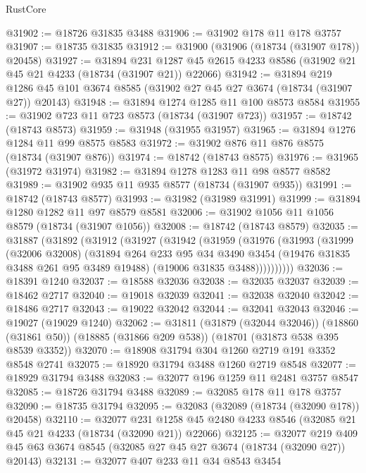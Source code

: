 \begin{lexlean}{RustCore}
\begin{coremodule}
@31902 := @18726 @31835 @3488
@31906 := @31902 @178 @11 @178 @3757
@31907 := @18735 @31835
@31912 := @31900 (@31906 (@18734 (@31907 @178)) @20458)
@31927 := @31894
    @231
    @1287
    @45
    @2615
    @4233
    @8586
    (@31902 @21 @45 @21 @4233 (@18734 (@31907 @21)) @22066)
@31942 := @31894
    @219
    @1286
    @45
    @101
    @3674
    @8585
    (@31902 @27 @45 @27 @3674 (@18734 (@31907 @27)) @20143)
@31948 := @31894 @1274 @1285 @11 @100 @8573 @8584
@31955 := @31902 @723 @11 @723 @8573 (@18734 (@31907 @723))
@31957 := @18742 (@18743 @8573)
@31959 := @31948 (@31955 @31957)
@31965 := @31894 @1276 @1284 @11 @99 @8575 @8583
@31972 := @31902 @876 @11 @876 @8575 (@18734 (@31907 @876))
@31974 := @18742 (@18743 @8575)
@31976 := @31965 (@31972 @31974)
@31982 := @31894 @1278 @1283 @11 @98 @8577 @8582
@31989 := @31902 @935 @11 @935 @8577 (@18734 (@31907 @935))
@31991 := @18742 (@18743 @8577)
@31993 := @31982 (@31989 @31991)
@31999 := @31894 @1280 @1282 @11 @97 @8579 @8581
@32006 := @31902 @1056 @11 @1056 @8579 (@18734 (@31907 @1056))
@32008 := @18742 (@18743 @8579)
@32035 := @31887
    (@31892
      (@31912
        (@31927
          (@31942
            (@31959
              (@31976
                (@31993
                  (@31999
                    (@32006 @32008)
                    (@31894
                      @264
                      @233
                      @95
                      @34
                      @3490
                      @3454
                      (@19476 @31835 @3488 @261 @95 @3489 @19488)
                      (@19006 @31835 @3488))))))))))
@32036 := @18391 @1240
@32037 := @18588 @32036
@32038 := @32035 @32037
@32039 := @18462 @2717
@32040 := @19018 @32039
@32041 := @32038 @32040
@32042 := @18486 @2717
@32043 := @19022 @32042
@32044 := @32041 @32043
@32046 := @19027 (@19029 @1240)
@32062 := @31811
    (@31879 (@32044 @32046))
    (@18860 (@31861 @50))
    (@18885 (@31866 @209 @538))
    (@18701 (@31873 @538 @395 @8539 @3352))
@32070 := @18908 @31794 @304 @1260 @2719 @191 @3352 @8548 @2741
@32075 := @18920 @31794 @3488 @1260 @2719 @8548
@32077 := @18929 @31794 @3488
@32083 := @32077 @196 @1259 @11 @2481 @3757 @8547
@32085 := @18726 @31794 @3488
@32089 := @32085 @178 @11 @178 @3757
@32090 := @18735 @31794
@32095 := @32083 (@32089 (@18734 (@32090 @178)) @20458)
@32110 := @32077
    @231
    @1258
    @45
    @2480
    @4233
    @8546
    (@32085 @21 @45 @21 @4233 (@18734 (@32090 @21)) @22066)
@32125 := @32077
    @219
    @409
    @45
    @63
    @3674
    @8545
    (@32085 @27 @45 @27 @3674 (@18734 (@32090 @27)) @20143)
@32131 := @32077 @407 @233 @11 @34 @8543 @3454

\end{coremodule}
\end{lexlean}

